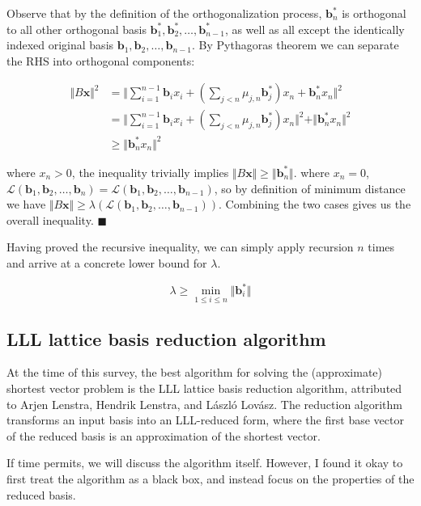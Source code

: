 \documentclass[letterpaper,12pt]{article}
\begin{document}
Observe that by the definition of the orthogonalization process, $\mathbf{b}_n^\ast$ is orthogonal to all other orthogonal basis $\mathbf{b}_1^\ast, \mathbf{b}_2^\ast, \ldots, \mathbf{b}_{n-1}^\ast$, as well as all except the identically indexed original basis $\mathbf{b}_1, \mathbf{b}_2, \ldots, \mathbf{b}_{n-1}$. By Pythagoras theorem we can separate the RHS into orthogonal components:

$$
\begin{aligned}
\Vert B\mathbf{x} \Vert^2 
&= \Vert \sum_{i=1}^{n-1}\mathbf{b}_ix_i + (\sum_{j<n}\mu_{j, n}\mathbf{b}_j^\ast) x_n  + \mathbf{b}_n^\ast x_n\Vert^2 \\
&= \Vert \sum_{i=1}^{n-1}\mathbf{b}_ix_i + (\sum_{j<n}\mu_{j, n}\mathbf{b}_j^\ast) x_n \Vert^2 + \Vert \mathbf{b}_n^\ast x_n \Vert^2 \\
&\geq \Vert \mathbf{b}_n^\ast x_n \Vert^2
\end{aligned}
$$

where $x_n > 0$, the inequality trivially implies $\Vert B\mathbf{x} \Vert \geq \Vert\mathbf{b}_n^\ast\Vert$. where $x_n = 0$, $\mathcal{L}(\mathbf{b}_1, \mathbf{b}_2, \ldots, \mathbf{b}_n) = \mathcal{L}(\mathbf{b}_1, \mathbf{b}_2, \ldots, \mathbf{b}_{n-1})$, so by definition of minimum distance we have $\Vert B\mathbf{x} \Vert \geq \lambda(\mathcal{L}(\mathbf{b}_1, \mathbf{b}_2, \ldots, \mathbf{b}_{n-1}))$. Combining the two cases gives us the overall inequality. $\blacksquare$

Having proved the recursive inequality, we can simply apply recursion $n$ times and arrive at a concrete lower bound for $\lambda$.

$$
\lambda \geq \min_{1 \leq i \leq n} \Vert \mathbf{b}_i^\ast \Vert
$$

\subsection{LLL lattice basis reduction algorithm}
At the time of this survey, the best algorithm for solving the (approximate) shortest vector problem is the LLL lattice basis reduction algorithm, attributed to Arjen Lenstra, Hendrik Lenstra, and László Lovász. The reduction algorithm transforms an input basis into an LLL-reduced form, where the first base vector of the reduced basis is an approximation of the shortest vector.

If time permits, we will discuss the algorithm itself. However, I found it okay to first treat the algorithm as a black box, and instead focus on the properties of the reduced basis.
\end{document}

